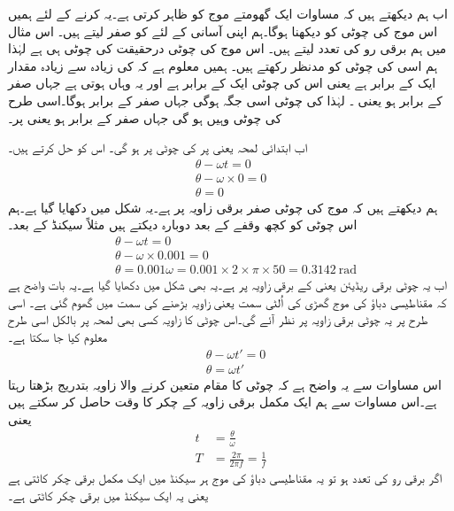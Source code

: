 اب ہم دیکھتے ہیں کہ مساوات  ایک گھومتے موج کو ظاہر کرتی ہے۔یہ کرنے کے لئے ہمیں اس موج کی چوٹی کو دیکھنا ہوگا۔ہم اپنی آسانی کے لئے   کو صفر لیتے ہیں۔ اس مثال میں ہم برقی رو کی تعدد   لیتے ہیں۔ اس موج کی چوٹی درحقیقت  کی چوٹی ہی ہے لہٰذا ہم اسی کی چوٹی کو مدنظر رکھتے ہیں۔ ہمیں معلوم ہے کہ  کی زیادہ سے زیادہ مقدار ایک کے برابر ہے یعنی اس کی چوٹی ایک کے برابر ہے اور یہ وہاں ہوتی ہے جہاں  صفر کے برابر ہو یعنی ۔ لہٰذا  کی چوٹی اسی جگہ ہوگی جہاں  صفر کے برابر ہوگا۔اسی طرح  کی چوٹی وہیں ہو گی جہاں  صفر کے برابر ہو یعنی  پر۔

اب ابتدائی لمحہ  یعنی  پر  کی چوٹی  پر ہو گی۔ اس کو حل کرتے ہیں۔
\begin{align*}
\theta-\omega t =0\\
\theta -\omega \times 0=0\\
\theta =0
\end{align*}
ہم دیکھتے ہیں کہ موج کی چوٹی صفر برقی زاویہ پر ہے۔یہ شکل  میں دکھایا گیا ہے۔ہم اس چوٹی کو کچھ وقفے کے بعد دوبارہ دیکتے ہیں مثلاً  سیکنڈ کے بعد۔
\begin{align*}
&\theta-\omega t =0\\
&\theta -\omega \times 0.001=0\\
&\theta =0.001 \omega =0.001 \times 2 \times \pi \times 50=\SI{0.3142}{\radian} 
\end{align*}
اب یہ چوٹی  برقی ریڈیئن یعنی  کے برقی زاویہ پر ہے۔یہ بھی شکل میں دکھایا گیا ہے۔یہ بات واضح ہے کہ مقناطیسی دباؤ کی موج گھڑی کی اُلٹی سمت یعنی زاویہ بڑھنے کی سمت میں گھوم گئی ہے۔ اسی طرح   پر یہ چوٹی  برقی زاویہ پر نظر آئے گی۔اس چوٹی کا زاویہ کسی بھی لمحہ  پر بالکل اسی طرح معلوم کیا جا سکتا ہے۔
\begin{align*}
&\theta-\omega t' =0\\
&\theta =\omega t'
\end{align*}
اس مساوات سے یہ واضح ہے کہ چوٹی کا مقام متعین کرنے والا زاویہ بتدریج بڑھتا رہتا ہے۔اس مساوات سے ہم ایک مکمل  برقی زاویہ کے چکر کا وقت  حاصل کر سکتے ہیں یعنی
\begin{align*}
t&=\frac{\theta}{\omega}\\
T&=\frac{2\pi}{2\pi f}=\frac{1}{f}
\end{align*}
اگر برقی رو کی تعدد  ہو تو یہ مقناطیسی دباؤ کی موج ہر  سیکنڈ میں ایک مکمل برقی چکر کاٹتی ہے یعنی یہ ایک سیکنڈ میں  برقی چکر کاٹتی ہے۔

